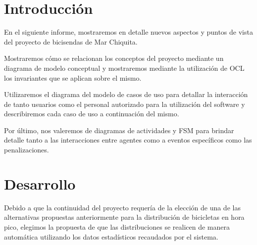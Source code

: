 \documentclass[a4paper, 10pt, twoside]{article}
\begin{document}
\newpage




\tableofcontents

\newpage




\section{Introducción}

En el siguiente informe, mostraremos en detalle nuevos aspectos y puntos de vista del proyecto de bicisendas de Mar Chiquita.

Mostraremos cómo se relacionan los conceptos del proyecto mediante un diagrama de modelo conceptual y mostraremos mediante la utilización de OCL los invariantes que se aplican sobre el mismo.

Utilizaremos el diagrama del modelo de casos de uso para detallar la interacción de tanto usuarios como el personal autorizado para la utilización del software y describiremos cada caso de uso a continuación del mismo.

Por último, nos valeremos de diagramas de actividades y FSM para brindar detalle tanto a las interacciones entre agentes como a eventos específicos como las penalizaciones.


\section{Desarrollo}
Debido a que la continuidad del proyecto requería de la elección de una de las alternativas propuestas anteriormente para la distribución de bicicletas en hora pico, elegimos la propuesta de que las distribuciones se realicen de manera automática utilizando los datos estadísticos recaudados por el sistema.
\end{document}
